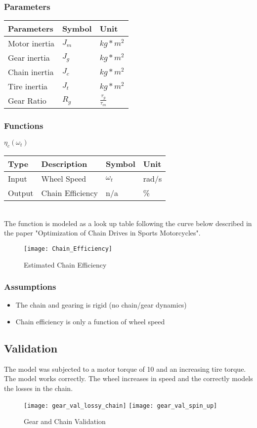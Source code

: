 \documentclass[../SimBALink.tex]{subfiles}
\begin{document}
\subsubsection{Parameters}
	\begin{tabular}{ l | l | l  }
		Parameters					&	Symbol		&	Unit		\\	\hline
		Motor inertia		&	$J_m$		&	 $kg*m^2$ \\ 
		Gear inertia		&	$J_g$		&	 $kg*m^2$ \\ 
		Chain inertia		&	$J_c$		&	 $kg*m^2$ \\ 
		Tire inertia		&	$J_t$		&	 $kg*m^2$ \\ 
		Gear Ratio			&	$R_g$		&	$\frac{\tau_g}{\tau_m}$
	\end{tabular}
	
\subsubsection{Functions}
$\eta_c(\omega_t)$ \\
	\begin{tabular}{ l | l | l | l }
		Type				& Description		&	Symbol		&	Unit		\\	\hline
		Input 				& Wheel Speed		&	$\omega_t$  & 	rad/s		\\
		Output 				& Chain Efficiency	&	n/a			&	\%
	\end{tabular} \\

The function is modeled as a look up table following the curve below described in the paper "Optimization of Chain Drives in Sports Motorcycles".

\begin{figure}[h!]
  \centering
  \texttt{[image: Chain\_Efficiency]}
  \caption{Estimated Chain Efficiency}
\end{figure}

\subsubsection{Assumptions}
\begin{itemize}
  \item The chain and gearing is rigid (no chain/gear dynamics)
  \item Chain efficiency is only a function of wheel speed
\end{itemize}

\subsection{Validation}

The model was subjected to a motor torque of 10 and an increasing tire torque. The model works correctly. The wheel increases in speed and the correctly models the losses in the chain.


\begin{figure}[h!]
\center
  \texttt{[image: gear\_val\_lossy\_chain]}
  \texttt{[image: gear\_val\_spin\_up]}
  \caption{Gear and Chain Validation}
\end{figure}
\end{document}
